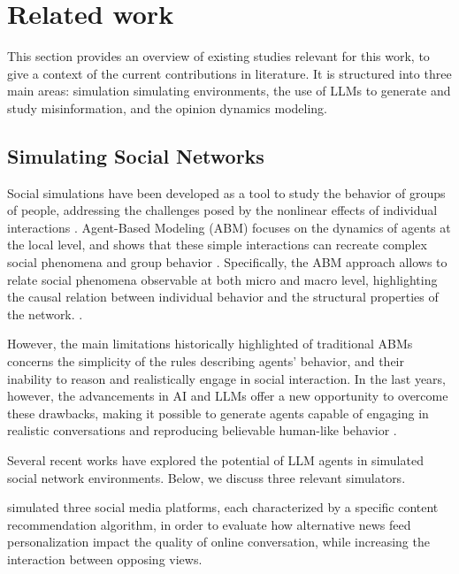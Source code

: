\section{Related work}
\label{sec:relatedwork}

This section provides an overview of existing studies relevant for this work, to give a context of the current contributions in literature.
It is structured into three main areas: simulation simulating environments, the use of LLMs to generate and study misinformation, and the opinion dynamics modeling.

\subsection{Simulating Social Networks}

Social simulations have been developed as a tool to study the behavior of groups of people, addressing the challenges posed by the nonlinear effects of individual interactions \cite{squazzoni2014socialsimulation}.
Agent-Based Modeling (ABM) focuses on the dynamics of agents at the local level, and shows that these simple interactions can recreate complex social phenomena and group behavior \cite{macy2002abm}.
Specifically, the ABM approach allows to relate social phenomena observable at both micro and macro level, highlighting the causal relation between individual behavior and the structural properties of the network. \cite{squazzoni2014socialsimulation}.

However, the main limitations historically highlighted of traditional ABMs concerns the simplicity of the rules \cite{conte2014agent} describing agents' behavior, and their inability to reason and realistically engage in social interaction.\cite{törnberg2023evaluate}
In the last years, however, the advancements in AI and LLMs offer a new opportunity to overcome these drawbacks, making it possible to generate agents capable of engaging in realistic conversations and reproducing believable human-like behavior \cite{park2023genagents}.

Several recent works have explored the potential of LLM agents in simulated social network environments. Below, we discuss three relevant simulators.

\medskip
\citet{törnberg2023evaluate} simulated three social media platforms, each characterized by a specific content recommendation algorithm, in order to evaluate how alternative news feed personalization impact the quality of online conversation, while increasing the interaction between opposing views.

